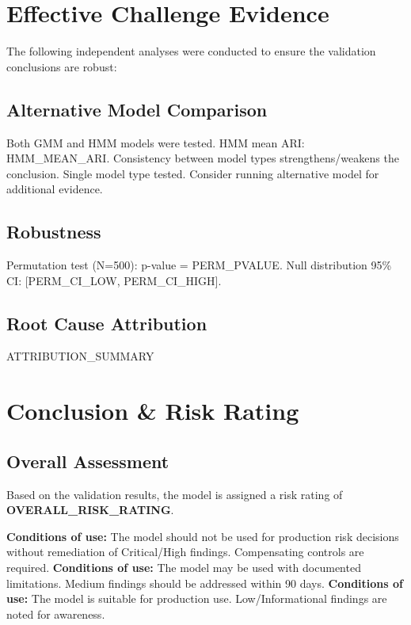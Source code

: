 \documentclass[11pt,a4paper]{article}
\begin{document}
\section{Effective Challenge Evidence}

The following independent analyses were conducted to ensure the validation
conclusions are robust:

\subsection{Alternative Model Comparison}
Both GMM and HMM models were tested. HMM mean ARI: {{HMM_MEAN_ARI}}.
Consistency between model types strengthens/weakens the conclusion.
Single model type tested. Consider running alternative model for additional evidence.

\subsection{Robustness}
Permutation test (N=500): p-value = {{PERM_PVALUE}}.
Null distribution 95\% CI: [{{PERM_CI_LOW}}, {{PERM_CI_HIGH}}].

\subsection{Root Cause Attribution}
{{ATTRIBUTION_SUMMARY}}

\section{Conclusion \& Risk Rating}

\subsection{Overall Assessment}
Based on the validation results, the model is assigned a risk rating of
\textbf{{{OVERALL_RISK_RATING}}}.

\textbf{Conditions of use:} The model should not be used for production
risk decisions without remediation of Critical/High findings.
Compensating controls are required.
\textbf{Conditions of use:} The model may be used with documented
limitations. Medium findings should be addressed within 90 days.
\textbf{Conditions of use:} The model is suitable for production use.
Low/Informational findings are noted for awareness.
\end{document}
